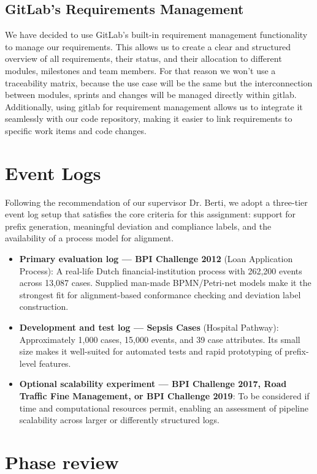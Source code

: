\documentclass[12pt,a4paper]{article}
\begin{document}
\subsection{GitLab's Requirements Management}
We have decided to use GitLab's built-in requirement management functionality \cite{gitlab2026} to manage our requirements. This allows us to create a clear and structured overview of all requirements, their status, and their allocation to different modules, milestones and team members. For that reason we won't use a traceability matrix, because the use case will be the same but the interconnection between modules, sprints and changes will be managed directly within gitlab. Additionally, using gitlab for requirement management allows us to integrate it seamlessly with our code repository, making it easier to link requirements to specific work items and code changes. 
\section{Event Logs}
Following the recommendation of our supervisor Dr. Berti, we adopt a three-tier event log setup that satisfies the core criteria for this assignment: support for prefix generation, meaningful deviation and compliance labels, and the availability of a process model for alignment.

\begin{itemize}
    \item \textbf{Primary evaluation log --- BPI Challenge 2012} (Loan Application Process): A real-life Dutch financial-institution process with 262,200 events across 13,087 cases. Supplied man-made BPMN/Petri-net models make it the strongest fit for alignment-based conformance checking and deviation label construction.
    \item \textbf{Development and test log --- Sepsis Cases} (Hospital Pathway): Approximately 1,000 cases, 15,000 events, and 39 case attributes. Its small size makes it well-suited for automated tests and rapid prototyping of prefix-level features.
    \item \textbf{Optional scalability experiment --- BPI Challenge 2017, Road Traffic Fine Management, or BPI Challenge 2019}: To be considered if time and computational resources permit, enabling an assessment of pipeline scalability across larger or differently structured logs.
\end{itemize}
\section{Phase review}
\end{document}
